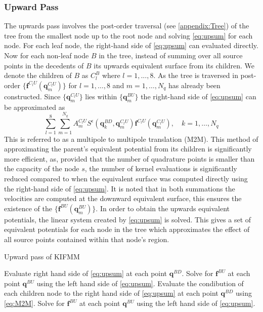 \subsubsection{Upward Pass}
The upwards pass involves the post-order traversal (see \cref{appendix:Tree}) of the tree from the smallest node up to the root node and solving \cref{eq:upsum} for each node. For each leaf node, the right-hand side of \cref{eq:upsum} can evaluated directly. Now for each non-leaf node $B$ in the tree, instead of summing over all source points in the decedents of $B$ its upwards equivalent surface from its children. We denote the children of $B$ as $C_l^B$ where $l=1,...,8$. As the tree is traversed in post-order $\{\bm{f}^{C_l U}(\bm{q}^{C_lU}_m)\}$ for $l=1,\dots,8$ and $m=1,\dots,N_q$ has already been constructed. Since $\{\bm{q}^{C_lU}_m\}$ lies within $\{\bm{q}^{BU}_m\}$ the right-hand side of \cref{eq:upsum} can be approximated as
\begin{equation}
\label{eq:M2M}
    \sum_{l=1}^{8} \sum_{m=1}^{N_{q}} A_{m}^{C_{l} U} S^\epsilon\left(\bm{q}_{k}^{B D}, \bm{q}_{m}^{C_{l} U}\right) \bm{f}^{C_{l} U}\left(\bm{q}_{m}^{C_{l} U}\right), \quad k=1,\dots,N_q
\end{equation}
This is referred to as a multipole to multipole translation (M2M). This method of approximating the parent's equivalent potential from its children is significantly more efficient, as, provided that the number of quadrature points is smaller than the capacity of the node $s$, the number of kernel evaluations is significantly reduced compared to when the equivalent surface was computed directly using the right-hand side of \cref{eq:upsum}. It is noted that in both summations the velocities are  computed at the downward equivalent surface, this ensures the existence of the $\{\bm{f}^{BU}(\bm{q}^{BU}_m)\}$. In order to obtain the upwards equivalent potentials, the linear system created by \cref{eq:upsum} is solved. This gives a set of equivalent potentials for each node in the tree which approximates the effect of all source points contained within that node's region.

\begin{algorithm}
\caption{Upward pass of KIFMM}\label{alg:UpKIFMM}
\begin{algorithmic}
\State Evaluate right hand side of \cref{eq:upsum} at each point $\bm{q}^{BD}$.
\State Solve for $\bm{f}^{BU}$ at each point $\bm{q}^{BU}$ using the left hand side of \cref{eq:upsum}.
\EndFor
{}
\State Evaluate the condibution of each children node to the right hand side of \cref{eq:upsum} 
\State \quad at each point $\bm{q}^{BD}$ using \cref{eq:M2M}.
\State Solve for $\bm{f}^{BU}$ at each point $\bm{q}^{BU}$ using the left hand side of \cref{eq:upsum}.
\EndFor
\end{algorithmic}
\end{algorithm}


